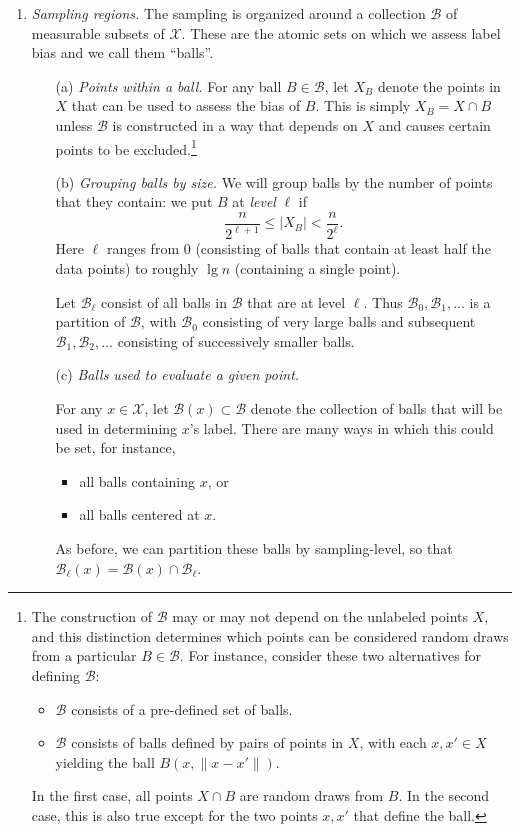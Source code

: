 \documentclass{article}
\def\X{{\mathcal X}}
\def\B{{\mathcal B}}
\begin{document}
\begin{enumerate}

\item {\it Sampling regions.}
The sampling is organized around a collection $\B$ of measurable subsets of $\X$. These are the atomic sets on which we assess label bias and we call them ``balls''.

\begin{enumerate}

\item[(a)] {\it Points within a ball.} For any ball $B \in \B$, let $X_B$ denote the points in $X$ that can be used to assess the bias of $B$. This is simply $X_B = X \cap B$ unless $\B$ is constructed in a way that depends on $X$ and causes certain points to be excluded.\footnote{The construction of $\B$ may or may not depend on the unlabeled points $X$, and this distinction determines which points can be considered random draws from a particular $B \in \B$. For instance, consider these two alternatives for defining $\B$:
\begin{itemize}
\item $\B$ consists of a pre-defined set of balls.
\item $\B$ consists of balls defined by pairs of points in $X$, with each $x,x' \in X$ yielding the ball $B(x,\|x-x'\|)$.
\end{itemize}
In the first case, all points $X \cap B$ are random draws from $B$. In the second case, this is also true except for the two points $x,x'$ that define the ball.}

\item[(b)] {\it Grouping balls by size.} We will group balls by the number of points that they contain: we put $B$ at {\it level} $\ell$ if
$$ \frac{n}{2^{\ell + 1}} \leq |X_B| < \frac{n}{2^\ell} .$$
Here $\ell$ ranges from $0$ (consisting of balls that contain at least half the data points) to roughly $\lg n$ (containing a single point). 

Let $\B_\ell$ consist of all balls in $\B$ that are at level $\ell$. Thus $\B_0, \B_1, \ldots$ is a partition of $\B$, with $\B_0$ consisting of very large balls and subsequent $\B_1, \B_2, \ldots$ consisting of successively smaller balls.

\item[(c)] {\it Balls used to evaluate a given point.}

For any $x \in \X$, let $\B(x) \subset \B$ denote the collection of balls that will be used in determining $x$'s label. There are many ways in which this could be set, for instance,
\begin{itemize}
\item all balls containing $x$, or
\item all balls centered at $x$.
\end{itemize}
As before, we can partition these balls by sampling-level, so that $\B_\ell(x) = \B(x) \cap \B_\ell$.


\end{enumerate}
\end{enumerate}
\end{document}
